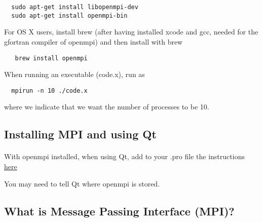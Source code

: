 \documentclass[%
oneside,                 %
final,                   %
10pt]{article}
\begin{document}
\begin{verbatim}
  sudo apt-get install libopenmpi-dev
  sudo apt-get install openmpi-bin

\end{verbatim}

For OS X users, install brew (after having installed xcode and gcc, needed for the 
gfortran compiler of openmpi) and then install with brew


\begin{verbatim}
   brew install openmpi

\end{verbatim}

When running an executable (code.x), run as


\begin{verbatim}
  mpirun -n 10 ./code.x

\end{verbatim}

where we indicate that we want  the number of processes to be 10.



\subsection*{Installing MPI and using Qt}

\paragraph{}
With openmpi installed, when using Qt, add to your .pro file the instructions \href{{http://dragly.org/2012/03/14/developing-mpi-applications-in-qt-creator/}}{here}

You may need to tell Qt where openmpi is stored.



\subsection*{What is Message Passing Interface (MPI)?}

\paragraph{}
\end{document}

